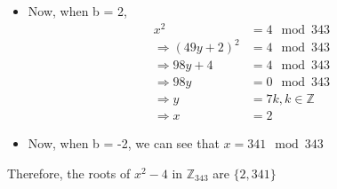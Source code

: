 \documentclass{article}
\theoremstyle{mytheoremstyle}
\theoremstyle{mytheoremstyle}
\theoremstyle{myproblemstyle}
\begin{document}
\begin{itemize}
\begin{itemize}
        \item Now, when b = 2,
        \begin{align*}
            x^2 &= 4 \mod 343 \\
            \Rightarrow {(49y+2)}^2 &= 4\mod 343 \\
            \Rightarrow 98y + 4 &= 4 \mod 343 \\
            \Rightarrow 98y &= 0 \mod 343 \\
            \Rightarrow y &= 7k, k \in \mathbb{Z} \\
            \Rightarrow x &= 2
        \end{align*}
        \item Now, when b = -2, we can see that $x = 341 \mod 343$
    \end{itemize}
\end{itemize}

Therefore, the roots of $x^2 - 4$ in $\mathbb{Z}_{343}$ are $\{2, 341\}$
\end{document}
